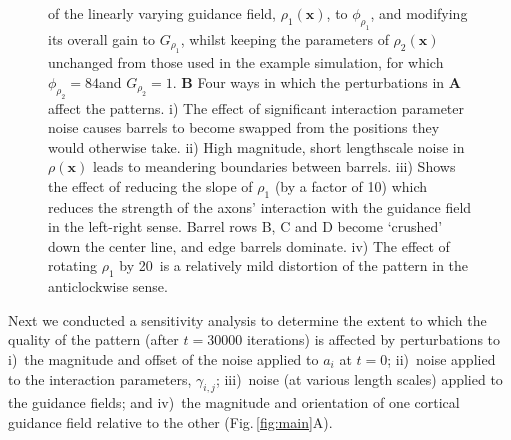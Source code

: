 \documentclass[9pt,lineno]{elife}
\newcommand{\MPthreeSens}[1]{\textcolor{colmpthreesens}{#1}}
\newcommand{\mb}[1]{\mathbf{#1}}
\begin{document}
\begin{figure}
\begin{fullwidth}
{{        of the linearly varying guidance field, $\rho_1(\mb{x})$, to $\phi_{\rho_1}$,
        and modifying its overall gain to $G_{\rho_1}$, whilst keeping the
        parameters of $\rho_2(\mb{x})$
        unchanged from those used in the example simulation, for which
        $\phi_{\rho_2}=84$\textdegree and $G_{\rho_2}=1$.
        \textbf{B} Four ways in which the perturbations in \textbf{A} affect
        the patterns. i) The effect of significant interaction parameter noise
        causes barrels to become swapped from the positions they would
        otherwise take. ii) High magnitude, short lengthscale noise in
        $\rho(\mb{x})$ leads to meandering boundaries between barrels. iii)
        Shows the effect of reducing the slope of $\rho_1$ (by a factor of 10)
        which reduces the strength of the axons' interaction with the guidance
        field in the left-right sense. Barrel rows B, C and D become `crushed'
        down the center line, and edge barrels dominate. iv) The effect of
        rotating $\rho_1$ by 20\textdegree~is a relatively mild distortion of
        the pattern in the anticlockwise sense.
      }
    }
    \label{fig:sens}
  \end{fullwidth}
\end{figure}


\MPthreeSens{Next we conducted a sensitivity analysis to determine the extent
  to which the quality of the pattern (after $t=30000$ iterations) is affected
  by perturbations to i)~the magnitude and offset of the noise applied to
  $a_i$ at $t=0$; ii)~noise applied to the interaction parameters,
  $\gamma_{i,j}$; iii)~noise (at various length scales) applied to the
  guidance fields; and iv)~the magnitude and orientation of one cortical
  guidance field relative to the other (Fig.\,\ref{fig:main}A).}
\end{document}
